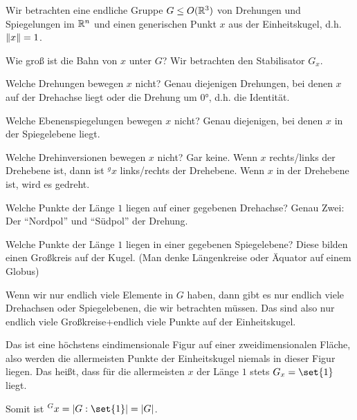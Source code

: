 \begin{corollary}
Wir betrachten eine endliche Gruppe $G\leq O(\mathbb{R}^3)$ von Drehungen und Spiegelungen im $\mathbb{R}^n$ und einen generischen Punkt $x$ aus der Einheitskugel, d.h. $\lVert x\rVert=1$.

Wie groß ist die Bahn von $x$ unter $G$? Wir betrachten den Stabilisator $G_x$.

\medbreak
Welche Drehungen bewegen $x$ nicht? Genau diejenigen Drehungen, bei denen $x$ auf der Drehachse liegt oder die Drehung um $0°$, d.h. die Identität.

Welche Ebenenspiegelungen bewegen $x$ nicht? Genau diejenigen, bei denen $x$ in der Spiegelebene liegt.

Welche Drehinversionen bewegen $x$ nicht? Gar keine. Wenn $x$ rechts/links der Drehebene ist, dann ist ${^g x}$ links/rechts der Drehebene. Wenn $x$ in der Drehebene ist, wird es gedreht.

\medbreak
Welche Punkte der Länge $1$ liegen auf einer gegebenen Drehachse? Genau Zwei: Der \enquote{Nordpol} und \enquote{Südpol} der Drehung.

Welche Punkte der Länge $1$ liegen in einer gegebenen Spiegelebene? Diese bilden einen Großkreis auf der Kugel. (Man denke Längenkreise oder Äquator auf einem Globus)

\medbreak
Wenn wir nur endlich viele Elemente in $G$ haben, dann gibt es nur endlich viele Drehachsen oder Spiegelebenen, die wir betrachten müssen. Das sind also nur endlich viele Großkreise+endlich viele Punkte auf der Einheitskugel.

Das ist eine höchstens eindimensionale Figur auf einer zweidimensionalen Fläche, also werden die allermeisten Punkte der Einheitskugel niemals in dieser Figur liegen. Das heißt, dass für die allermeisten $x$ der Länge $1$ stets $G_x=\set{1}$ liegt.

Somit ist ${^G x} = \abs{G:\set{1}} = \abs{G}$.
\end{corollary}